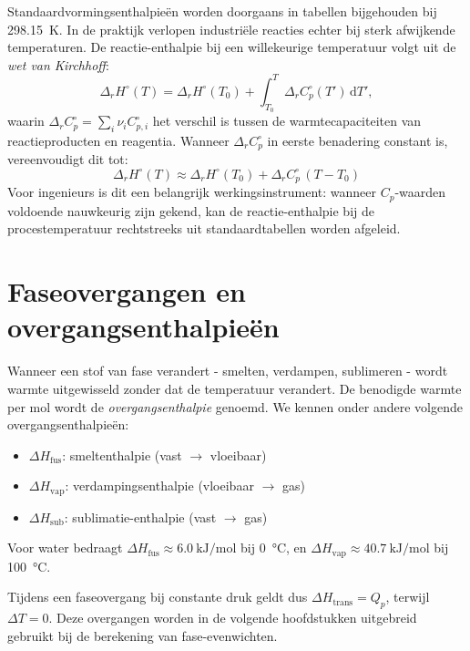 Standaardvormingsenthalpie\"en worden doorgaans in tabellen bijgehouden bij \SI{298.15}{\kelvin}. In de praktijk verlopen industri\"ele reacties echter bij sterk afwijkende temperaturen. De reactie-enthalpie bij een willekeurige temperatuur volgt uit de \emph{wet van Kirchhoff}:
\begin{equation}
\Delta_r H^\circ(T) = \Delta_r H^\circ(T_0) + \int_{T_0}^{T} \Delta_r C_p^\circ(T')\,\mathrm{d}T',
\end{equation}
waarin $\Delta_r C_p^\circ = \sum_i \nu_i C_{p,i}^\circ$ het verschil is tussen de warmtecapaciteiten van reactieproducten en reagentia. Wanneer $\Delta_r C_p^\circ$ in eerste benadering constant is, vereenvoudigt dit tot:
\begin{equation}
\boxed{\Delta_r H^\circ(T) \approx \Delta_r H^\circ(T_0) + \Delta_r C_p^\circ\,(T - T_0)}
\end{equation}
Voor ingenieurs is dit een belangrijk werkingsinstrument: wanneer $C_p$-waarden voldoende nauwkeurig zijn gekend, kan de reactie-enthalpie bij de procestemperatuur rechtstreeks uit standaardtabellen worden afgeleid.

\section{Faseovergangen en overgangsenthalpie\"en}

Wanneer een stof van fase verandert - smelten, verdampen, sublimeren - wordt warmte uitgewisseld zonder dat de temperatuur verandert. De benodigde warmte per mol wordt de \emph{overgangsenthalpie} genoemd. We kennen onder andere volgende overgangsenthalpieën:
\begin{itemize}
\item $\Delta H_{\text{fus}}$: smeltenthalpie (vast $\rightarrow$ vloeibaar)
\item $\Delta H_{\text{vap}}$: verdampingsenthalpie (vloeibaar $\rightarrow$ gas)
\item $\Delta H_{\text{sub}}$: sublimatie-enthalpie (vast $\rightarrow$ gas)
\end{itemize}
Voor water bedraagt $\Delta H_{\text{fus}} \approx \SI{6.0}{\kilo\joule\per\mole}$ bij \SI{0}{\celsius}, en $\Delta H_{\text{vap}} \approx \SI{40.7}{\kilo\joule\per\mole}$ bij \SI{100}{\celsius}.

Tijdens een faseovergang bij constante druk geldt dus $\Delta H_{\text{trans}} = Q_p$, terwijl $\Delta T = 0$. Deze overgangen worden in de volgende hoofdstukken uitgebreid gebruikt bij de berekening van fase-evenwichten.

